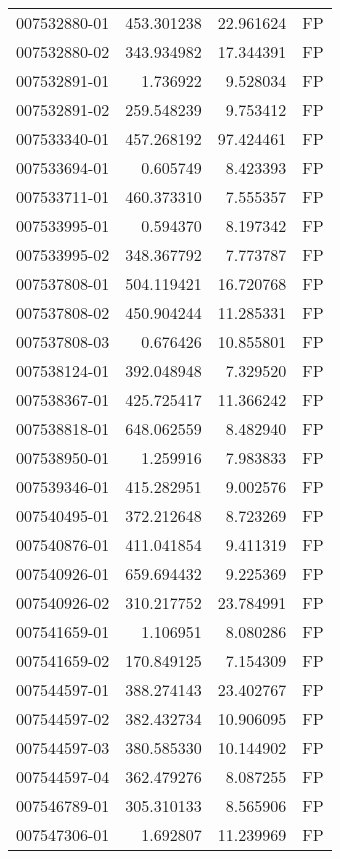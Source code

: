 \begin{tabular}{lrrl}
007532880-01 &  453.301238 &    22.961624 &   FP \\
007532880-02 &  343.934982 &    17.344391 &   FP \\
007532891-01 &    1.736922 &     9.528034 &   FP \\
007532891-02 &  259.548239 &     9.753412 &   FP \\
007533340-01 &  457.268192 &    97.424461 &   FP \\
007533694-01 &    0.605749 &     8.423393 &   FP \\
007533711-01 &  460.373310 &     7.555357 &   FP \\
007533995-01 &    0.594370 &     8.197342 &   FP \\
007533995-02 &  348.367792 &     7.773787 &   FP \\
007537808-01 &  504.119421 &    16.720768 &   FP \\
007537808-02 &  450.904244 &    11.285331 &   FP \\
007537808-03 &    0.676426 &    10.855801 &   FP \\
007538124-01 &  392.048948 &     7.329520 &   FP \\
007538367-01 &  425.725417 &    11.366242 &   FP \\
007538818-01 &  648.062559 &     8.482940 &   FP \\
007538950-01 &    1.259916 &     7.983833 &   FP \\
007539346-01 &  415.282951 &     9.002576 &   FP \\
007540495-01 &  372.212648 &     8.723269 &   FP \\
007540876-01 &  411.041854 &     9.411319 &   FP \\
007540926-01 &  659.694432 &     9.225369 &   FP \\
007540926-02 &  310.217752 &    23.784991 &   FP \\
007541659-01 &    1.106951 &     8.080286 &   FP \\
007541659-02 &  170.849125 &     7.154309 &   FP \\
007544597-01 &  388.274143 &    23.402767 &   FP \\
007544597-02 &  382.432734 &    10.906095 &   FP \\
007544597-03 &  380.585330 &    10.144902 &   FP \\
007544597-04 &  362.479276 &     8.087255 &   FP \\
007546789-01 &  305.310133 &     8.565906 &   FP \\
007547306-01 &    1.692807 &    11.239969 &   FP \\

\end{tabular}
